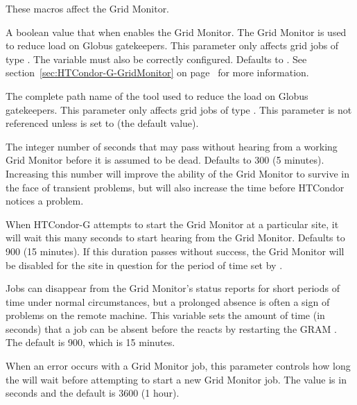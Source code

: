 These macros affect the Grid Monitor.
\begin{description}

\label{param:EnableGridMonitor}
\item[\Macro{ENABLE\_GRID\_MONITOR}]
  A boolean value that when  enables the Grid Monitor.
  The Grid Monitor is used to reduce load on Globus gatekeepers.
  This parameter only affects grid jobs of type .
  The variable  must also be correctly configured.
  Defaults to .
  See section~\ref{sec:HTCondor-G-GridMonitor} on
  page~\pageref{sec:HTCondor-G-GridMonitor}
  for more information.

\label{param:GridMonitor}
\item[\Macro{GRID\_MONITOR}]
  The complete path name of the  tool used to reduce
  the load on Globus gatekeepers.
  This parameter only affects grid jobs of type .
  This parameter is not referenced unless
   is set to  (the default value). 

\label{param:GridMonitorHeartbeatTimeout}
\item[\Macro{GRID\_MONITOR\_HEARTBEAT\_TIMEOUT}]
  The integer number of seconds that may pass without hearing from a 
  working Grid Monitor before it is assumed to be dead.
  Defaults to 300 (5 minutes).  Increasing this number
  will improve the ability of the Grid Monitor to survive in the face of
  transient problems,
  but will also increase the time before HTCondor notices a problem.

\label{param:GridMonitorRetryDuration}
\item[\Macro{GRID\_MONITOR\_RETRY\_DURATION}]
  When HTCondor-G attempts to start the Grid Monitor at a particular
  site, it will wait this many seconds to start hearing from the
  Grid Monitor. Defaults to 900 (15 minutes).  If this duration
  passes without success, the Grid Monitor will be disabled for the
  site in question for the period of time set by
  .

\label{param:GridMonitorNoStatusTimeout}
\item[\Macro{GRID\_MONITOR\_NO\_STATUS\_TIMEOUT}]
  Jobs can disappear from the Grid Monitor's status reports for
  short periods of time under normal circumstances, but a prolonged
  absence is often a sign of problems on the remote machine. This variable
  sets the amount of time (in seconds) that a job can be absent before the
   reacts by restarting the GRAM .
  The default is 900, which is 15 minutes.

\label{param:GridMonitorDisableTime}
\item[\Macro{GRID\_MONITOR\_DISABLE\_TIME}]
  When an error occurs with a Grid Monitor job, this parameter controls
  how long the  will wait before attempting to
  start a new Grid Monitor job. The value is in seconds and the default
  is 3600 (1 hour).

\end{description}


